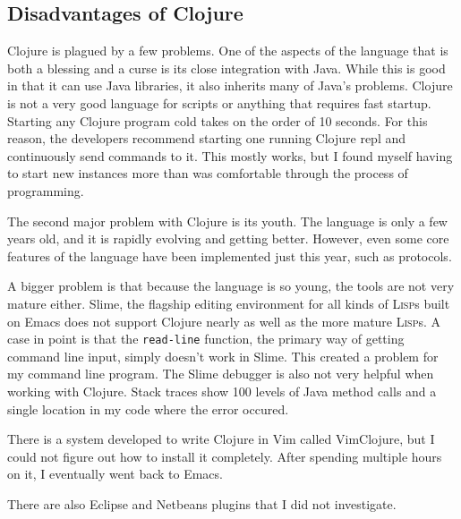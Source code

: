 \documentclass{article}
\begin{document}
\subsection{Disadvantages of Clojure}

Clojure is plagued by a few problems.  One of the aspects of the language that
is both a blessing and a curse is its close integration with Java.  While this
is good in that it can use Java libraries, it also inherits many of Java's
problems.  Clojure is not a very good language for scripts or anything that
requires fast startup.  Starting any Clojure program cold takes on the order of
10 seconds.  For this reason, the developers recommend starting one running
Clojure repl and continuously send commands to it.  This mostly works, but I
found myself having to start new instances more than was comfortable through the
process of programming.

The second major problem with Clojure is its youth.  The language is only
a few years old, and it is rapidly evolving and getting better.  However, even
some core features of the language have been implemented just this year, such as
protocols.

A bigger problem is that because the language is so young, the tools are not
very mature either.  Slime, the flagship editing environment for all kinds of
\textsc{Lisp}s built on Emacs does not support Clojure nearly as well as the more mature
\textsc{Lisp}s.  A case in point is that the \texttt{read-line} function, the primary way of
getting command line input, simply doesn't work in Slime.  This created a
problem for my command line program.  The Slime debugger is also not very
helpful when working with Clojure.  Stack traces show 100 levels of Java
method calls and a single location in my code where the error occured.

There is a system developed to write Clojure in Vim called VimClojure, but I
could not figure out how to install it completely.  After spending multiple
hours on it, I eventually went back to Emacs.

There are also Eclipse and Netbeans plugins that I did not investigate.
\end{document}

